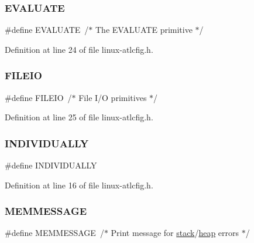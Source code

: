 \subsubsection{\texorpdfstring{E\+V\+A\+L\+U\+A\+TE}{EVALUATE}}
{\footnotesize\ttfamily \#define E\+V\+A\+L\+U\+A\+TE~/$\ast$ The E\+V\+A\+L\+U\+A\+TE primitive $\ast$/}



Definition at line 24 of file linux-\/atlcfig.\+h.

\mbox{\label{linux-atlcfig_8h_a6031789d52541d1bd1e7b028322fd7fd}} 
\subsubsection{\texorpdfstring{F\+I\+L\+E\+IO}{FILEIO}}
{\footnotesize\ttfamily \#define F\+I\+L\+E\+IO~/$\ast$ File I/O primitives $\ast$/}



Definition at line 25 of file linux-\/atlcfig.\+h.

\mbox{\label{linux-atlcfig_8h_a48c036bd8ba1fdc29f0981ff7ee3d9b5}} 
\subsubsection{\texorpdfstring{I\+N\+D\+I\+V\+I\+D\+U\+A\+L\+LY}{INDIVIDUALLY}}
{\footnotesize\ttfamily \#define I\+N\+D\+I\+V\+I\+D\+U\+A\+L\+LY}



Definition at line 16 of file linux-\/atlcfig.\+h.

\mbox{\label{linux-atlcfig_8h_a3a12ced9ae9a894dbc0a31282e769d63}} 
\subsubsection{\texorpdfstring{M\+E\+M\+M\+E\+S\+S\+A\+GE}{MEMMESSAGE}}
{\footnotesize\ttfamily \#define M\+E\+M\+M\+E\+S\+S\+A\+GE~/$\ast$ Print message for \hyperlink{FreeRTOS_2atlast_8c_a119bff668c1f986f35cdc8a167c756bb}{stack}/\hyperlink{FreeRTOS_2atlast_8c_a631c4c438b300c6392fe526a50a041c3}{heap} errors $\ast$/}



